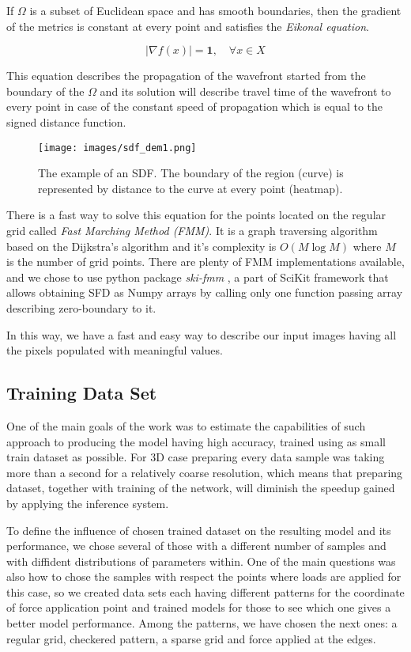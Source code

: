 If $\Omega$ is a subset of Euclidean space and has smooth boundaries, then the gradient of the metrics is constant at every point and satisfies the \emph{Eikonal equation}.

\[
 |\nabla f(x)| = \mathbf{1}, \quad \forall x \in X
\]

This equation describes the propagation of the wavefront started from the boundary of the $\Omega$ and its solution will describe travel time of the wavefront to every point in case of the constant speed of propagation which is equal to the signed distance function.
\medskip
\begin{figure}
	\centering
	\texttt{[image: images/sdf\_dem1.png]}
	\label{fig:sdf_ex}
	\caption{The example of an SDF. The boundary of the region (curve) is represented by distance to the curve at every point (heatmap).  }
\end{figure}

There is a fast way to solve this equation for the points located on the regular grid called \emph{Fast Marching Method (FMM)}.
It is a graph traversing algorithm based on the Dijkstra's algorithm \cite{} and it's complexity is $O(M \log M)$ where $M$ is the number of grid points.
There are plenty of FMM implementations available, and we chose to use python package \emph{ski-fmm} \cite{scikit-fmm}, a part of SciKit framework that allows obtaining SFD as Numpy array\cite{}s by calling only one function passing array describing zero-boundary to it.
\medskip

In this way, we have a fast and easy way to describe our input images having all the pixels populated with meaningful values.

\subsection{Training Data Set}

One of the main goals of the work was to estimate the capabilities of such approach to producing the model having high accuracy, trained using as small train dataset as possible.
For 3D case preparing every data sample was taking more than a second for a relatively coarse resolution, which means that preparing dataset, together with training of the network, will diminish the speedup gained by applying the inference system.  

To define the influence of chosen trained dataset on the resulting model and its performance, we chose several of those with a different number of samples and with diffident distributions of parameters within. 
One of the main questions was also how to chose the samples with respect the points where loads are applied for this case, so we created data sets each having different patterns for the coordinate of force application point and trained models for those to see which one gives a better model performance.
Among the patterns, we have chosen the next ones: a regular grid, checkered pattern, a sparse grid and force applied at the edges.

